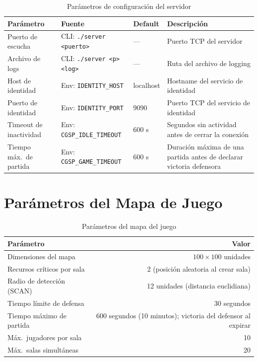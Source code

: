 \documentclass[12pt, letterpaper]{article}
\begin{document}
\begin{table}[H]
\centering
\begin{tabularx}{\textwidth}{l l l X}
\toprule
\textbf{Parámetro} & \textbf{Fuente} & \textbf{Default} & \textbf{Descripción} \\
\midrule
Puerto de escucha    & CLI: \texttt{./server <puerto>}   & ---         & Puerto TCP del servidor \\
Archivo de logs      & CLI: \texttt{./server <p> <log>}  & ---         & Ruta del archivo de logging \\
Host de identidad    & Env: \texttt{IDENTITY\_HOST}      & localhost   & Hostname del servicio de identidad \\
Puerto de identidad  & Env: \texttt{IDENTITY\_PORT}      & 9090        & Puerto TCP del servicio de identidad \\
Timeout de inactividad & Env: \texttt{CGSP\_IDLE\_TIMEOUT} & 600 s    & Segundos sin actividad antes de cerrar la conexión \\
Tiempo máx.\ de partida & Env: \texttt{CGSP\_GAME\_TIMEOUT} & 600 s   & Duración máxima de una partida antes de declarar victoria defensora \\
\bottomrule
\end{tabularx}
\caption{Parámetros de configuración del servidor}
\end{table}

\section{Parámetros del Mapa de Juego}

\begin{table}[H]
\centering
\begin{tabular}{l r}
\toprule
\textbf{Parámetro} & \textbf{Valor} \\
\midrule
Dimensiones del mapa             & $100 \times 100$ unidades \\
Recursos críticos por sala       & 2 (posición aleatoria al crear sala) \\
Radio de detección (\textsc{SCAN}) & 12 unidades (distancia euclidiana) \\
Tiempo límite de defensa         & 30 segundos \\
Tiempo máximo de partida         & 600 segundos (10 minutos); victoria del defensor al expirar \\
Máx.\ jugadores por sala         & 10 \\
Máx.\ salas simultáneas          & 20 \\
\bottomrule
\end{tabular}
\caption{Parámetros del mapa del juego}
\end{table}
\end{document}
